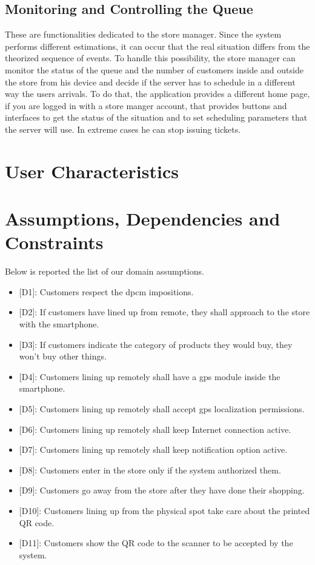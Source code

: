 \subsection{Monitoring and Controlling the Queue}
These are functionalities dedicated to the store manager. Since the system performs different estimations, it can occur that the real situation differs from the theorized sequence of events.
To handle this possibility, the store manager can monitor the status of the queue and the number of customers inside and outside the store from his device and decide if the server has to schedule in a different way the users arrivals.
To do that, the application provides a different home page, if you are logged in with a store manger account, that provides buttons and interfaces to get the status of the situation and to set scheduling parameters that the server will use. In extreme cases he can stop issuing tickets.


\section{User Characteristics}

\section{Assumptions, Dependencies and Constraints}

Below is reported the list of our domain assumptions.

\begin{itemize}

	\item {[D1]}: Customers respect the \gls{dpcm} impositions.
	\item {[D2]}: If customers have lined up from remote, they shall approach to the store with the smartphone.
	\item {[D3]}: If customers indicate the category of products they would buy, they won't buy other things.
	\item {[D4]}: Customers lining up remotely shall have a \gls{gps} module inside the smartphone.
	\item {[D5]}: Customers lining up remotely shall accept \gls{gps} localization permissions.
	\item {[D6]}: Customers lining up remotely shall keep Internet connection active.
	\item {[D7]}: Customers lining up remotely shall keep notification option active.
	\item {[D8]}: Customers enter in the store only if the system authorized them.
	\item {[D9]}: Customers go away from the store after they have done their shopping.
	\item {[D10]}: Customers lining up from the physical spot take care about the printed QR code.
	\item {[D11]}: Customers show the QR code to the scanner to be accepted by the system.

\end{itemize}